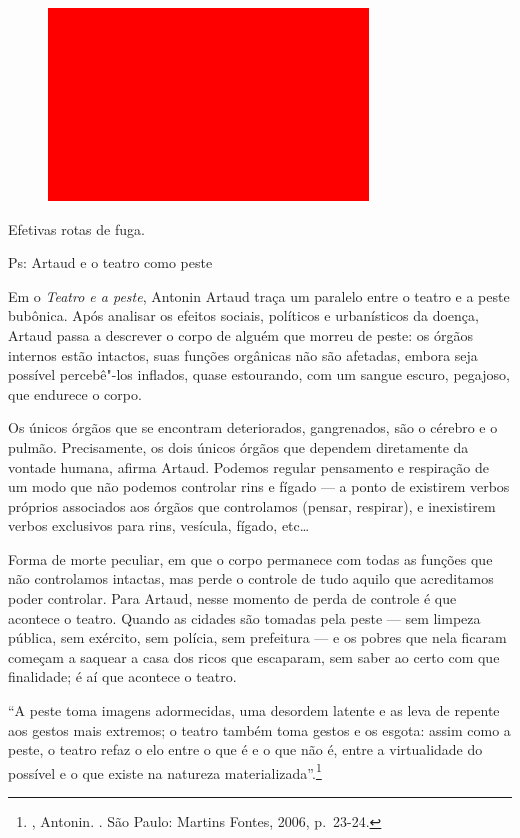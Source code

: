 \begin{figure}[!ht]
\centering
 \includegraphics[width=85mm]{./imgs/im1.jpg}
\caption{\footnotesize{}}
\end{figure}

Efetivas rotas de fuga.

\asterisc

Ps: Artaud e o teatro como peste

Em o \emph{Teatro e a peste}, Antonin Artaud traça um paralelo entre o
teatro e a peste bubônica. Após analisar os efeitos sociais, políticos e
urbanísticos da doença, Artaud passa a descrever o corpo de alguém que
morreu de peste: os órgãos internos estão intactos, suas funções
orgânicas não são afetadas, embora seja possível percebê"-los inflados,
quase estourando, com um sangue escuro, pegajoso, que endurece o corpo.

Os únicos órgãos que se encontram deteriorados, gangrenados, são o
cérebro e o pulmão. Precisamente, os dois únicos órgãos que dependem
diretamente da vontade humana, afirma Artaud. Podemos regular
pensamento e respiração de um modo que não podemos controlar rins e
fígado --- a ponto de existirem verbos próprios associados aos órgãos que
controlamos (pensar, respirar), e inexistirem verbos exclusivos para
rins, vesícula, fígado, etc\ldots{}

Forma de morte peculiar, em que o corpo permanece com todas as funções
que não controlamos intactas, mas perde o controle de tudo aquilo que
acreditamos poder controlar. Para Artaud, nesse momento de perda de
controle é que acontece o teatro. Quando as cidades são tomadas pela
peste --- sem limpeza pública, sem exército, sem polícia, sem prefeitura ---
e os pobres que nela ficaram começam a saquear a casa dos ricos que
escaparam, sem saber ao certo com que finalidade; é aí que acontece o
teatro.

``A peste toma imagens adormecidas, uma desordem latente e as leva de
repente aos gestos mais extremos; o teatro também toma gestos e os
esgota: assim como a peste, o teatro refaz o elo entre o que é e o que
não é, entre a virtualidade do possível e o que existe na natureza
materializada''.\footnote{, Antonin. {}.
  São Paulo: Martins Fontes, 2006, p.~23-24.}

